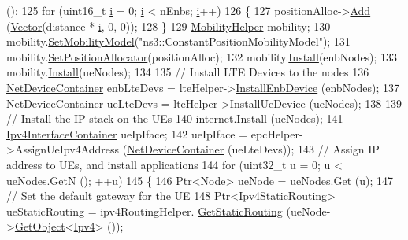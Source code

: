 \begin{DoxyCode}
      ();
125   \textcolor{keywordflow}{for} (uint16\_t \hyperlink{bernuolliDistribution_8m_a6f6ccfcf58b31cb6412107d9d5281426}{i} = 0; \hyperlink{bernuolliDistribution_8m_a6f6ccfcf58b31cb6412107d9d5281426}{i} < nEnbs; \hyperlink{bernuolliDistribution_8m_a6f6ccfcf58b31cb6412107d9d5281426}{i}++)
126     \{
127       positionAlloc->\hyperlink{classns3_1_1ListPositionAllocator_a460e82f015ac012a73ba0ea0cccb3486}{Add} (\hyperlink{classns3_1_1Vector3D_a7e59b47bc94c9cb1dadff68c1d0112d8}{Vector}(distance * \hyperlink{bernuolliDistribution_8m_a6f6ccfcf58b31cb6412107d9d5281426}{i}, 0, 0));
128     \}
129   \hyperlink{classns3_1_1MobilityHelper}{MobilityHelper} mobility;
130   mobility.\hyperlink{classns3_1_1MobilityHelper_a030275011b6f40682e70534d30280aba}{SetMobilityModel}(\textcolor{stringliteral}{"ns3::ConstantPositionMobilityModel"});
131   mobility.\hyperlink{classns3_1_1MobilityHelper_ac59d5295076be3cc11021566713a28c5}{SetPositionAllocator}(positionAlloc);
132   mobility.\hyperlink{classns3_1_1MobilityHelper_a07737960ee95c0777109cf2994dd97ae}{Install}(enbNodes);
133   mobility.\hyperlink{classns3_1_1MobilityHelper_a07737960ee95c0777109cf2994dd97ae}{Install}(ueNodes);
134 
135   \textcolor{comment}{// Install LTE Devices to the nodes}
136   \hyperlink{classns3_1_1NetDeviceContainer}{NetDeviceContainer} enbLteDevs = lteHelper->\hyperlink{classns3_1_1LteHelper_a5e009ad35ef85f46b5a6099263f15a03}{InstallEnbDevice} (enbNodes);
137   \hyperlink{classns3_1_1NetDeviceContainer}{NetDeviceContainer} ueLteDevs = lteHelper->\hyperlink{classns3_1_1LteHelper_ac9cd932d7de92811cfa953c2e3b2fc9f}{InstallUeDevice} (ueNodes);
138 
139   \textcolor{comment}{// Install the IP stack on the UEs}
140   internet.\hyperlink{classns3_1_1InternetStackHelper_a6645b412f31283d2d9bc3d8a95cebbc0}{Install} (ueNodes);
141   \hyperlink{classns3_1_1Ipv4InterfaceContainer}{Ipv4InterfaceContainer} ueIpIface;
142   ueIpIface = epcHelper->AssignUeIpv4Address (\hyperlink{classns3_1_1NetDeviceContainer}{NetDeviceContainer} (ueLteDevs));
143   \textcolor{comment}{// Assign IP address to UEs, and install applications}
144   \textcolor{keywordflow}{for} (uint32\_t u = 0; u < ueNodes.\hyperlink{classns3_1_1NodeContainer_aed647ac56d0407a7706aba02eb44b951}{GetN} (); ++u)
145     \{
146       \hyperlink{classns3_1_1Ptr}{Ptr<Node>} ueNode = ueNodes.\hyperlink{classns3_1_1NodeContainer_a9ed96e2ecc22e0f5a3d4842eb9bf90bf}{Get} (u);
147       \textcolor{comment}{// Set the default gateway for the UE}
148       \hyperlink{classns3_1_1Ptr}{Ptr<Ipv4StaticRouting>} ueStaticRouting = ipv4RoutingHelper.
      \hyperlink{classns3_1_1Ipv4StaticRoutingHelper_a731206e50d305695dac7fb2ef963a4bb}{GetStaticRouting} (ueNode->\hyperlink{classns3_1_1Object_a13e18c00017096c8381eb651d5bd0783}{GetObject}<\hyperlink{classns3_1_1Ipv4}{Ipv4}> ());

\end{DoxyCode}
